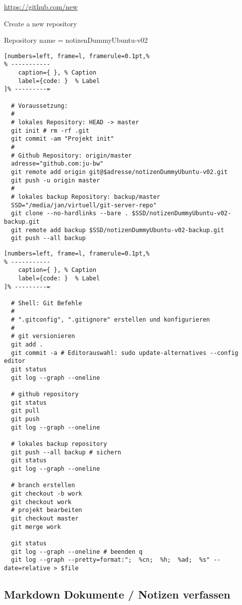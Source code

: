\url{https://github.com/new}

Create a new repository

Repository name = notizenDummyUbuntu-v02

\lstset{language=Bash} %
\begin{lstlisting}[numbers=left, frame=l, framerule=0.1pt,%
% -----------
	caption={ }, % Caption
	label={code: }  % Label
]% ---------=

  # Voraussetzung:
  #
  # lokales Repository: HEAD -> master
  git init # rm -rf .git
  git commit -am "Projekt init"
  #
  # Github Repository: origin/master
  adresse="github.com:ju-bw"
  git remote add origin git@$adresse/notizenDummyUbuntu-v02.git
  git push -u origin master
  #
  # lokales backup Repository: backup/master
  SSD="/media/jan/virtuell/git-server-repo"
  git clone --no-hardlinks --bare . $SSD/notizenDummyUbuntu-v02-backup.git
  git remote add backup $SSD/notizenDummyUbuntu-v02-backup.git
  git push --all backup
\end{lstlisting}

\lstset{language=Bash} %
\begin{lstlisting}[numbers=left, frame=l, framerule=0.1pt,%
% -----------
	caption={ }, % Caption
	label={code: }  % Label
]% ---------=

  # Shell: Git Befehle
  #
  # ".gitconfig", ".gitignore" erstellen und konfigurieren
  #
  # git versionieren
  git add .
  git commit -a # Editorauswahl: sudo update-alternatives --config editor
  git status
  git log --graph --oneline

  # github repository
  git status
  git pull
  git push
  git log --graph --oneline

  # lokales backup repository
  git push --all backup # sichern
  git status
  git log --graph --oneline

  # branch erstellen
  git checkout -b work
  git checkout work
  # projekt bearbeiten
  git checkout master
  git merge work

  git status
  git log --graph --oneline # beenden q
  git log --graph --pretty=format:";  %cn;  %h;  %ad;  %s" --date=relative > $file
\end{lstlisting}

\subsection{Markdown Dokumente / Notizen
verfassen}\label{markdown-dokumente-notizen-verfassen}

